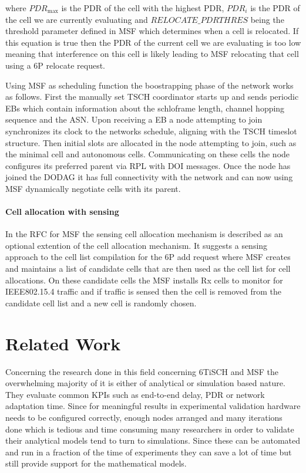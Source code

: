 \documentclass{comnets-thesis}
\begin{document}
where $PDR_{\max}$ is the PDR of the cell with the highest PDR, $PDR_i$ is the PDR of the cell we are currently evaluating and $RELOCATE\_PDRTHRES$ being the threshold parameter defined in \ac{MSF} which determines when a cell is relocated. If this equation is true then the PDR of the current cell we are evaluating is too low meaning that interference on this cell is likely leading to MSF relocating that cell using a \ac{6P} relocate request.

Using \ac{MSF} as scheduling function the boostrapping phase of the network works as follows. First the manually set \ac{TSCH} coordinator starts up and sends periodic \acp{EB} which contain information about the schloframe length, channel hopping sequence and the \ac{ASN}. Upon receiving a \ac{EB} a node attempting to join synchronizes its clock to the networks schedule, aligning with the \ac{TSCH} timeslot structure. Then initial slots are allocated in the node attempting to join, such as the minimal cell and autonomous cells. Communicating on these cells the node configures its preferred parent via \ac{RPL} with DOI messages. Once the node has joined the \ac{DODAG} it has full connectivity with the network and can now using \ac{MSF} dynamically negotiate cells with its parent.


\subsubsection*{ Cell allocation with sensing }
\label{sec:cell-allo-with-sensing}
In the RFC for \ac{MSF} \cite{RFC9033ForMSF} the sensing cell allocation mechanism is described as an optional extention of the cell allocation mechanism. It suggests a sensing approach to the cell list compilation for the 6P add request where \ac{MSF} creates and maintains a list of candidate cells that are then used as the cell list for cell allocations. On these candidate cells the \ac{MSF} installs Rx cells to monitor for IEEE802.15.4 traffic and if traffic is sensed then the cell is removed from the candidate cell list and a new cell is randomly chosen.





\chapter{Related Work}\label{chp:related}
Concerning the research done in this field concerning \ac{6TiSCH} and \ac{MSF} the overwhelming majority of it is either of analytical or simulation based nature. They evaluate common \acp{KPI} such as end-to-end delay, \ac{PDR} or network adaptation time. Since for meaningful results in experimental validation hardware needs to be configured correctly, enough nodes arranged and many iterations done which is tedious and time consuming many researchers in order to validate their analytical models tend to turn to simulations. Since these can be automated and run in a fraction of the time of experiments they can save a lot of time but still provide support for the mathematical models.
\end{document}
